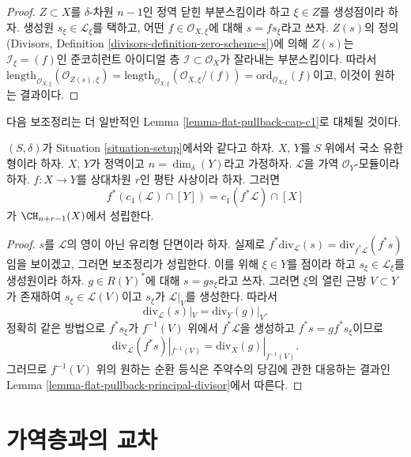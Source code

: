 \begin{proof}
$Z \subset X$를 $\delta$-차원 $n - 1$인 정역 닫힌 부분스킴이라 하고
$\xi \in Z$를 생성점이라 하자. 생성원
$s_\xi \in \mathcal{L}_\xi$를 택하고, 어떤
$f \in \mathcal{O}_{X, \xi}$에 대해 $s = fs_\xi$라고 쓰자.
$Z(s)$의 정의(Divisors, Definition
\ref{divisors-definition-zero-scheme-s})에 의해 $Z(s)$는
$\mathcal{I}_\xi = (f)$인 준코히런트 아이디얼 층
$\mathcal{I} \subset \mathcal{O}_X$가 잘라내는 부분스킴이다. 따라서
$\text{length}_{\mathcal{O}_{X, \xi}}(\mathcal{O}_{Z(s), \xi})
=
\text{length}_{\mathcal{O}_{X, \xi}}(\mathcal{O}_{X, \xi}/(f))
=
\text{ord}_{\mathcal{O}_{X, \xi}}(f)$이고, 이것이 원하는 결과이다.
\end{proof}

\noindent
다음 보조정리는 더 일반적인 Lemma \ref{lemma-flat-pullback-cap-c1}로
대체될 것이다.

\begin{lemma}
\label{lemma-flat-pullback-divisor-invertible-sheaf}
$(S, \delta)$가 Situation \ref{situation-setup}에서와 같다고 하자.
$X$, $Y$를 $S$ 위에서 국소 유한형이라 하자. $X$, $Y$가 정역이고
$n = \dim_\delta(Y)$라고 가정하자. $\mathcal{L}$을 가역
$\mathcal{O}_Y$-모듈이라 하자. $f : X \to Y$를 상대차원 $r$인 평탄
사상이라 하자. 그러면
$$
f^*(c_1(\mathcal{L}) \cap [Y]) = c_1(f^*\mathcal{L}) \cap [X]
$$
가 $\CH_{n + r - 1}(X)$에서 성립한다.
\end{lemma}

\begin{proof}
$s$를 $\mathcal{L}$의 영이 아닌 유리형 단면이라 하자. 실제로
$f^*\text{div}_\mathcal{L}(s) = \text{div}_{f^*\mathcal{L}}(f^*s)$임을
보이겠고, 그러면 보조정리가 성립한다. 이를 위해 $\xi \in Y$를 점이라
하고 $s_\xi \in \mathcal{L}_\xi$를 생성원이라 하자.
$g \in R(Y)^*$에 대해 $s = gs_\xi$라고 쓰자. 그러면 $\xi$의 열린 근방
$V \subset Y$가 존재하여 $s_\xi \in \mathcal{L}(V)$이고 $s_\xi$가
$\mathcal{L}|_V$를 생성한다. 따라서
$$
\text{div}_\mathcal{L}(s)|_V = \text{div}_Y(g)|_V.
$$
정확히 같은 방법으로 $f^*s_\xi$가 $f^{-1}(V)$ 위에서
$f^*\mathcal{L}$을 생성하고 $f^*s = g f^*s_\xi$이므로
$$
\text{div}_\mathcal{L}(f^*s)|_{f^{-1}(V)}
=
\text{div}_X(g)|_{f^{-1}(V)}.
$$
그러므로 $f^{-1}(V)$ 위의 원하는 순환 등식은 주약수의 당김에 관한
대응하는 결과인 Lemma \ref{lemma-flat-pullback-principal-divisor}에서
따른다.
\end{proof}



\section{가역층과의 교차}
\label{section-intersecting-with-divisors}

